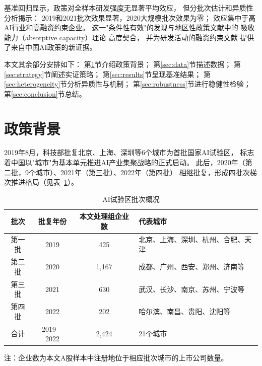 \documentclass[12pt, a4paper]{article}
\begin{document}
基准回归显示，政策对全样本研发强度无显著平均效应，
但分批次估计和异质性分析揭示：
2019和2021批次效果显著，2020大规模批次效果为零；
效应集中于高AI行业和高融资约束企业。
这一"条件性有效"的发现与地区性政策文献中的
吸收能力（absorptive capacity）理论
\parencite{cohen1990absorptive}高度契合，
并为研发活动的融资约束文献
\parencite{hall2010financing}提供了来自中国AI政策的新证据。

本文其余部分安排如下：
第\ref{sec:background}节介绍政策背景；
第\ref{sec:data}节描述数据；
第\ref{sec:strategy}节阐述实证策略；
第\ref{sec:results}节呈现基准结果；
第\ref{sec:heterogeneity}节分析异质性与机制；
第\ref{sec:robustness}节进行稳健性检验；
第\ref{sec:conclusion}节总结。

\section{政策背景}
\label{sec:background}

2019年8月，科技部批复北京、上海、深圳等6个城市为首批国家AI试验区，
标志着中国以"城市"为基本单元推进AI产业集聚战略的正式启动。
此后，2020年（第二批，9个城市）、2021年（第三批）、2022年（第四批）
相继批复，形成四批次梯次推进格局（见表~\ref{tab:batch}）。

\begin{table}[htbp]
\centering
\caption{AI试验区批次概况}
\label{tab:batch}
\begin{threeparttable}
\begin{tabular}{cccp{5.5cm}}
\toprule
批次 & 批复年份 & 本文处理组企业数 & 代表城市 \\
\midrule
第一批 & 2019 & 425   & 北京、上海、深圳、杭州、合肥、天津 \\
第二批 & 2020 & 1,167 & 成都、广州、西安、郑州、济南等 \\
第三批 & 2021 & 630   & 武汉、长沙、南京、苏州、宁波等 \\
第四批 & 2022 & 202   & 哈尔滨、南昌、贵阳、沈阳等 \\
\midrule
合计   & 2019—2022 & 2,424 & 21个城市 \\
\bottomrule
\end{tabular}
\begin{tablenotes}
\small\kaiti
\item 注：企业数为本文A股样本中注册地位于相应批次城市的上市公司数量。
\end{tablenotes}
\end{threeparttable}
\end{table}
\end{document}
